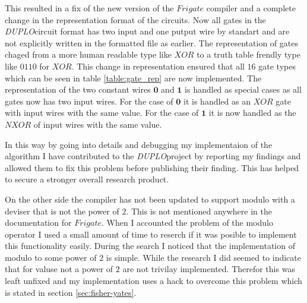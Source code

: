 \documentclass[twoside,11pt,openright]{report}
\newcommand{\DUPLO}{\textit{DUPLO}}
\begin{document}
\begin{table}
\label{table:gate_rep}
\centering
{}
\caption{A table of the 16 different gate types that can be used in a circuit of the type used in duplo}
\end{table}


This resulted in a fix of the new version of the $Frigate$ compiler and a complete change in the representation format of the circuits. Now all gates in the \DUPLO circuit format has two input and one putput wire by standart and are not explicitly written in the formatted file as earlier. The representation of gates chaged from a more human readable type like $XOR$ to a truth table frendly type like $0110$ for $XOR$. This change in representation ensured that all $16$ gate types which can be seen in table \ref{table:gate_rep} are now implemented. The representation of the two constant wires $\textbf{0}$ and $\textbf{1}$ is handled as special cases as all gates now has two input wires. For the case of $\textbf{0}$ it is handled as an $XOR$ gate with input wires with the same value. For the case of $\textbf{1}$ it is now handled as the $NXOR$ of input wires with the same value.

In this way by going into details and debugging my implementaion of the algorithm I have contributed to the \DUPLO project by reporting my findings and allowed them to fix this problem before publishing their finding. This has helped to secure a stronger overall research product.

On the other side the compiler has not been updated to support modulo with a deviser that is not the power of $2$. This is not mentioned anywhere in the documentation for $Frigate$. When I accounted the problem of the modulo operator I used a small amount of time to reserch if it was posible to implement this functionality easily. During the search I noticed that the implementation of modulo to some power of $2$ is simple. While the research I did seemed to indicate that for valuse not a power of $2$ are not trivilay implemented. Therefor this was leaft unfixed and my implementation uses a hack to overcome this problem which is stated in section \ref{sec:fisher-yates}.
\end{document}
